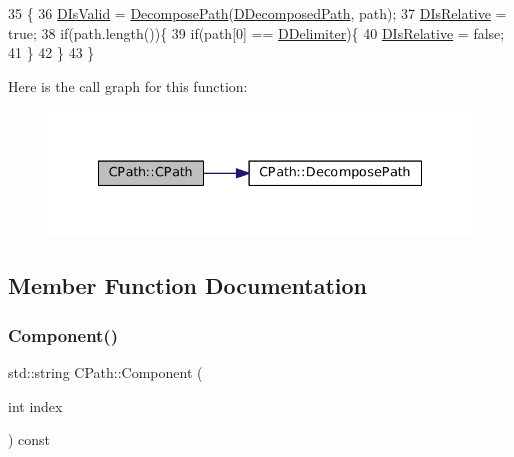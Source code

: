 \begin{DoxyCode}
35                                  \{
36     \hyperlink{classCPath_a992aca27a1cba1c3bae3d04438821192}{DIsValid} = \hyperlink{classCPath_aae05f3c3502e92bf68d5ce71264c7bb9}{DecomposePath}(\hyperlink{classCPath_a03ed25209a01e633c107a0c877fc61f8}{DDecomposedPath}, path);
37     \hyperlink{classCPath_af705ff149bb2281c67afb84fff550eb9}{DIsRelative} = \textcolor{keyword}{true};
38     \textcolor{keywordflow}{if}(path.length())\{
39         \textcolor{keywordflow}{if}(path[0] == \hyperlink{classCPath_a4af2d74fc7695c4de8900dcc426530b5}{DDelimiter})\{
40             \hyperlink{classCPath_af705ff149bb2281c67afb84fff550eb9}{DIsRelative} = \textcolor{keyword}{false};   
41         \}
42     \}
43 \}
\end{DoxyCode}
Here is the call graph for this function\+:\nopagebreak
\begin{figure}[H]
\begin{center}
\leavevmode
\includegraphics[width=335pt]{classCPath_aceb476f21440713272cf0ef38f2619c6_cgraph}
\end{center}
\end{figure}


\subsection{Member Function Documentation}
\hypertarget{classCPath_a7396f770babe0fbea344afa76d31da7c}{}\label{classCPath_a7396f770babe0fbea344afa76d31da7c} 
\subsubsection{\texorpdfstring{Component()}{Component()}}
{\footnotesize\ttfamily std\+::string C\+Path\+::\+Component (\begin{DoxyParamCaption}\item[{int}]{index }\end{DoxyParamCaption}) const\hspace{0.3cm}{\ttfamily [inline]}}



